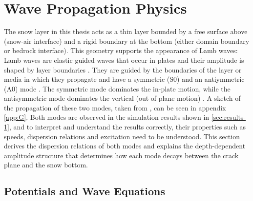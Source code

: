 \section{Wave Propagation Physics}
\label{sec:wave_physics}

The snow layer in this thesis acts as a thin layer bounded by a free surface above (snow-air interface) and a rigid boundary at the bottom (either domain boundary or bedrock interface). This geometry supports the appearance of Lamb waves: Lamb waves are elastic guided waves that occur in plates \parencite{suFundamentalsAnalysisLamb2009} and their amplitude is shaped by layer boundaries \parencite{lambWavesElasticPlate1917}.  They are guided by the boundaries of the layer or media in which they propagate and have a symmetric (S0) and an antiymmetric (A0) mode \parencite{suFundamentalsAnalysisLamb2009}. The symmetric mode dominates the in-plate motion, while the antisymmetric mode dominates the vertical (out of plane motion) \parencite{suFundamentalsAnalysisLamb2009}. A sketch of the propagation of these two modes, taken from \cite{cartaLambWavesDiscrete2023}, can be seen in appendix \ref{app:G}. Both modes are observed in the simulation results shown in \ref{sec:results-1}, and to interpret and understand the results correctly, their properties such as speeds, dispersion relations and excitation need to be understood. This section derives the dispersion relations of both modes and explains the depth-dependent amplitude structure that determines how each mode decays between the crack plane and the snow bottom. \par


\subsection{Potentials and Wave Equations}

